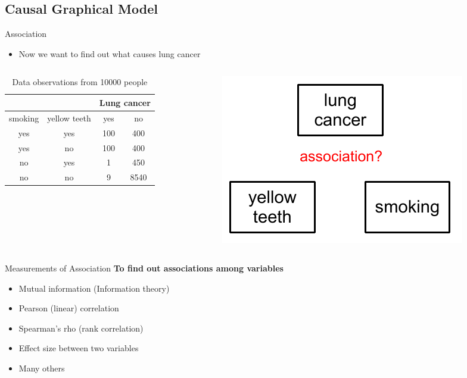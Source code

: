 \documentclass{beamer}
\begin{document}
\subsection{Causal Graphical Model}
\begin{frame}{Association}
\begin{itemize}
\item Now we want to find out what \alert{causes} lung cancer
\end{itemize} \pause
\begin{columns}
\begin{column}{0.5\textwidth}
\begin{table}
\centering
\begin{tabular}{|c|c|c|c|}
\hline
& & \multicolumn{2}{|c|}{Lung cancer}\\\hline
smoking & yellow teeth & yes & no\\\hline
yes & yes & 100 & 400\\\hline
yes & no & 100 & 400\\\hline
no & yes & 1 & 450\\\hline
no & no & 9 & 8540\\\hline
\end{tabular}
\caption{Data observations from 10000 people}
\end{table}
\end{column}\hfill
\begin{column}{0.5\textwidth}
\vspace*{-0.5in}
\begin{figure}
\centering
\includegraphics[scale=0.6]{imgs/smokepl}
\end{figure}
\end{column}
\end{columns}
\end{frame}
\begin{frame}{Measurements of Association}
\textbf{To find out associations among variables}
\begin{itemize}
\item Mutual information (Information theory)
\item Pearson (linear) correlation
\item Spearman's rho (rank correlation)
\item Effect size between two variables
\item Many others
\end{itemize}
\end{frame}
\end{document}
